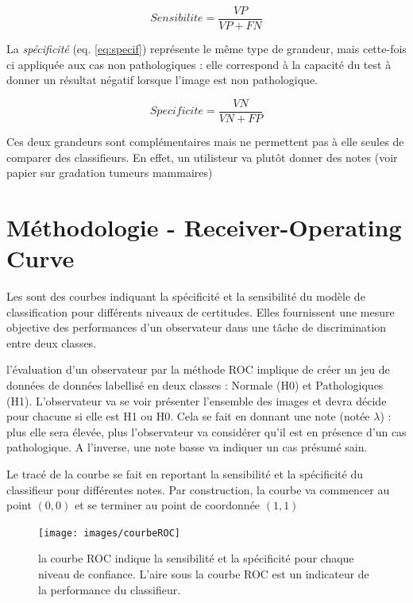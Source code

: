 \begin{equation}
	\label{eq:sensib}
	Sensibilite = \frac{VP}{VP + FN}
\end{equation}

La \emph{spécificité} (eq. \ref{eq:specif}) représente le même type de grandeur, mais cette-fois ci appliquée aux cas non pathologiques : elle correspond à la capacité du test à donner un résultat négatif lorsque l'image est non pathologique.

\begin{equation}
	\label{eq:specif}
	Specificite = \frac{VN}{VN + FP}
\end{equation}

Ces deux grandeurs sont complémentaires mais ne permettent pas à elle seules de comparer des classifieurs. En effet, un  utilisteur va plutôt donner des notes (voir papier sur gradation tumeurs mammaires)

	\section{Méthodologie \ROC - Receiver-Operating Curve}

Les \ROC sont des courbes indiquant la spécificité et la sensibilité du modèle de classification pour différents niveaux de certitudes. Elles fournissent une mesure objective des performances d'un observateur dans une tâche de discrimination entre deux classes. 

l'évaluation d'un observateur par la méthode ROC implique de créer un jeu de données de données labellisé en deux classes : Normale (H0) et Pathologiques (H1). L'observateur va se voir présenter l'ensemble des images et devra décide pour chacune si elle est H1 ou H0. Cela se fait en donnant une note (notée $\lambda$) : plus elle sera élevée, plus l'observateur va considérer qu'il est en présence d'un cas pathologique. A l'inverse, une note basse va indiquer un cas présumé sain.

Le tracé de la courbe \ROC se fait en reportant la sensibilité et la spécificité du classifieur pour différentes notes. Par construction, la courbe va commencer au point $(0,0)$ et se terminer au point de coordonnée $(1,1)$

\begin{figure}[h]
	
	\label{fig:courbeROC}
	\begin{center}
	\texttt{[image: images/courbeROC]}
	\end{center}
	\caption{la courbe ROC indique la sensibilité et la spécificité pour chaque niveau de confiance. L'aire sous la courbe ROC est un indicateur de la performance du classifieur.}
\end{figure}

